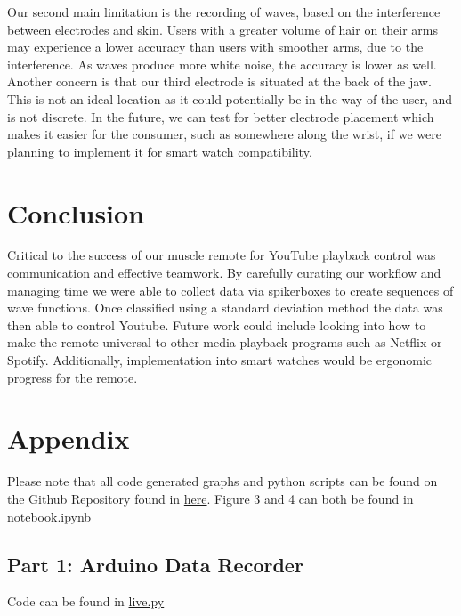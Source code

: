 \documentclass[oneside]{article}
\begin{document}
Our second main limitation is the recording of waves, based on the interference between electrodes and skin. Users with a greater volume of hair on their arms may experience a lower accuracy than users with smoother arms, due to the interference. As waves produce more white noise, the accuracy is lower as well. Another concern is that our third electrode is situated at the back of the jaw. This is not an ideal location as it could potentially be in the way of the user, and is not discrete. In the future, we can test for better electrode placement which makes it easier for the consumer, such as somewhere along the wrist, if we were planning to implement it for smart watch compatibility. 

\section{Conclusion}
Critical to the success of our muscle remote for YouTube playback control was communication and effective teamwork. By carefully curating our workflow and managing time we were able to collect data via spikerboxes to create sequences of wave functions. Once classified using a standard deviation method the data was then able to control Youtube. Future work could include looking into how to make the remote universal to other media playback programs such as Netflix or Spotify. Additionally, implementation into smart watches would be ergonomic progress for the remote. 
\newpage
\section{Appendix}

Please note that all code generated graphs and python scripts can be found on the Github Repository found in  \href{https://github.com/yingzhenwang/Brain}{here}. Figure 3 and 4 can both be found in \href{https://github.com/yingzhenwang/Brain/blob/main/notebook.ipynb}{notebook.ipynb}


\subsection{Part 1: Arduino Data Recorder}

Code can be found in  \href{https://github.com/yingzhenwang/Brain/blob/main/Chrome/live.py}{live.py}
\end{document}
